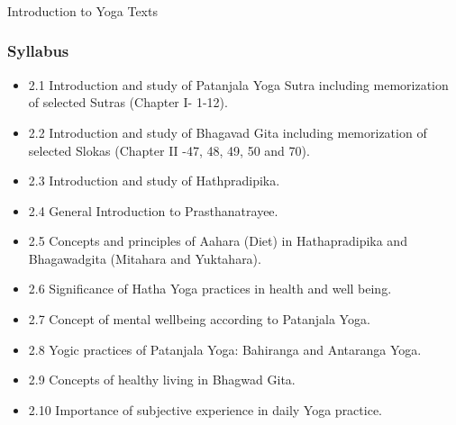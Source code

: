 
\begin{frame}[fragile]\frametitle{}
\begin{center}
{\Large Introduction to Yoga Texts }
\end{center}
\end{frame}

\begin{frame}[fragile]\frametitle{Syllabus}

\begin{itemize}
\item 2.1  Introduction  and  study  of  Patanjala  Yoga  Sutra  including  memorization  of  selected Sutras (Chapter I- 1-12). 
\item 2.2  Introduction  and  study  of  Bhagavad  Gita  including  memorization  of  selected  Slokas (Chapter II -47, 48, 49, 50 and 70). 
\item 2.3  Introduction and study of Hathpradipika.  
\item 2.4  General Introduction to Prasthanatrayee. 
\item 2.5  Concepts  and  principles  of  Aahara  (Diet)  in  Hathapradipika  and  Bhagawadgita  (Mitahara and Yuktahara). 
\item 2.6  Significance of Hatha Yoga practices in health and well being. 
\item 2.7  Concept of mental wellbeing according to Patanjala Yoga. 
\item 2.8  Yogic practices of Patanjala Yoga: Bahiranga and Antaranga Yoga. 
\item 2.9  Concepts of healthy living in Bhagwad Gita. 
\item 2.10  Importance of subjective experience in daily Yoga practice. 
\end{itemize}
	  
\end{frame}



